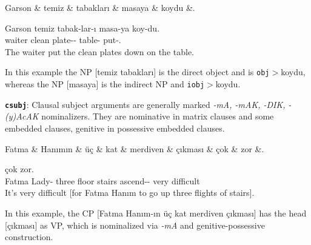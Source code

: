 \documentclass[11pt,a4paper]{article}
\begin{document}
\begin{exe}
\ex \label{iobj}
\begin{dependency}
\begin{deptext}[column sep=0.3cm]
Garson \& temiz \& tabakları \& masaya \& koydu \&. \\
\end{deptext}
\end{dependency}
\gll Garson temiz tabak-lar-ı masa-ya koy-du. \\
waiter clean plate-\Pl{}-\Acc{} table-\Dat{} put-\Pst{}. \\
\glt The waiter put the clean plates down on the table.
\end{exe}

In this example the NP [temiz tabakları] is the direct object and is \texttt{obj}$>$koydu, whereas the NP [masaya] is the indirect NP and \texttt{iobj}$>$koydu. 

\textbf{\texttt{csubj}}:
Clausal subject arguments are generally marked \textit{-mA, -mAK, -DIK, -(y)AcAK} nominalizers. They are nominative in matrix clauses and some embedded clauses, genitive in possessive embedded clauses.

\begin{exe}
\ex \label{csubj}
\begin{dependency}
\begin{deptext}[column sep=0.3cm]
Fatma \& Hanımın \& üç \& kat \& merdiven \& çıkması \& çok \& zor \&. \\
\end{deptext}
\end{dependency}

 çok zor. \\
Fatma Lady-\Gen{} three floor stairs ascend-\Nmlz{}-\Tsg{} very difficult \\
\glt It’s very difficult [for Fatma Hanım to go up three flights of stairs].
\end{exe}
In this example, the CP [Fatma Hanım-ın üç kat merdiven çıkması] has the head [çıkması] as VP, which is nominalized via \textit{-mA} and genitive-possessive construction. 
\end{document}
